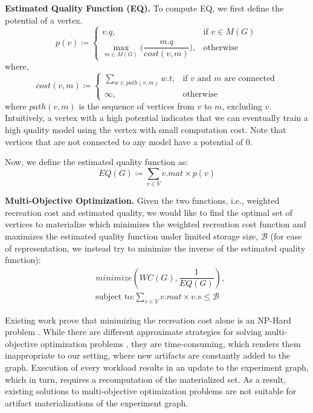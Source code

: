 \textbf{Estimated Quality Function (EQ).} 
To compute EQ, we first define the potential of a vertex.
\[
p( v) \coloneqq  
		\begin{cases}
		v.q , & \text{if } v \in M(G)  \\
		\max\limits_{m \in M(G)} \Big( \dfrac{m.q}{cost(v,m)} \Big) , & \text{otherwise}
		\end{cases}
\]
where,
\[
cost(v,m) \coloneqq 
\begin{cases}
\sum\limits_{w \in path(v, m)} w.t, & \text{if } v  \text{ and } m \text{ are connected} \\
\infty, & \text{otherwise}
\end{cases}
\]
where $path(v, m)$ is the sequence of vertices from $v$ to $m$, excluding $v$.
Intuitively, a vertex with a high potential indicates that we can eventually train a high quality model using the vertex with small computation cost.
Note that vertices that are not connected to any model have a potential of 0.

Now, we define the estimated quality function as:
\[
EQ(G) \coloneqq  \sum\limits_{v \in V}  v.mat \times p(v)
\]

\textbf{Multi-Objective Optimization.}
Given the two functions, i.e., weighted recreation cost and estimated quality, we would like to find the optimal set of vertices to materialize which minimizes the weighted recreation cost function and maximizes the estimated quality function under limited storage size, $\mathcal{B}$ (for ease of representation, we instead try to minimize the inverse of the estimated quality function):
\begin{equation}
\begin{split}
& minimize(WC(G), \dfrac{1}{EQ(G)}), \\
& \text{subject to:} \sum\limits_{v \in V} v.mat \times v.s \leq \mathcal{B}
\end{split}
\end{equation}

Existing work prove that minimizing the recreation cost alone is an NP-Hard problem \cite{bhattacherjee2015principles}.
While there are different approximate strategies for solving multi-objective optimization problems \cite{coello2007evolutionary}, they are time-consuming, which renders them inappropriate to our setting, where new artifacts are constantly added to the graph.
Execution of every workload results in an update to the experiment graph, which in turn, requires a recomputation of the materialized set.
As a result, existing solutions to multi-objective optimization problems are not suitable for artifact materializations of the experiment graph.

